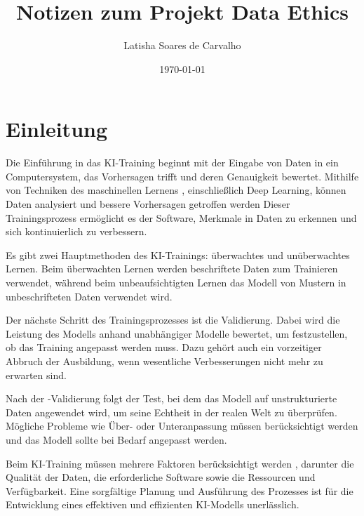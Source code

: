 \documentclass{article}
\title{Notizen zum Projekt Data Ethics}
\author{Latisha Soares de Carvalho}
\date{\today}
\begin{document}
\maketitle




\tableofcontents
\section {Einleitung}                            
    
    Die Einführung in das KI-Training beginnt mit der Eingabe von Daten in ein Computersystem, das Vorhersagen trifft und deren Genauigkeit bewertet.
    Mithilfe von Techniken des maschinellen Lernens , einschließlich Deep Learning, können Daten analysiert und bessere Vorhersagen getroffen werden
    Dieser Trainingsprozess ermöglicht es der Software, Merkmale in Daten zu erkennen und sich kontinuierlich zu verbessern.
    
    Es gibt zwei Hauptmethoden des KI-Trainings: überwachtes und unüberwachtes Lernen.
    Beim überwachten Lernen werden beschriftete Daten zum Trainieren verwendet, während beim unbeaufsichtigten Lernen das Modell von Mustern in unbeschrifteten Daten verwendet wird.
    
    Der nächste Schritt des Trainingsprozesses ist die Validierung. Dabei wird die Leistung des Modells anhand unabhängiger Modelle bewertet, um festzustellen, ob das Training angepasst werden muss.
    Dazu gehört auch ein vorzeitiger Abbruch der Ausbildung, wenn wesentliche Verbesserungen nicht mehr zu erwarten sind.

    Nach der -Validierung folgt der Test, bei dem das Modell auf unstrukturierte Daten angewendet wird, um seine Echtheit in der realen Welt zu überprüfen.
    Mögliche Probleme wie Über- oder Unteranpassung müssen berücksichtigt werden und das Modell sollte bei Bedarf angepasst werden.

    Beim KI-Training müssen mehrere Faktoren berücksichtigt werden , darunter die Qualität der Daten, die erforderliche Software sowie die Ressourcen und Verfügbarkeit.
    Eine sorgfältige Planung und Ausführung des Prozesses ist für die Entwicklung eines effektiven und effizienten KI-Modells unerlässlich.
\end{document}
